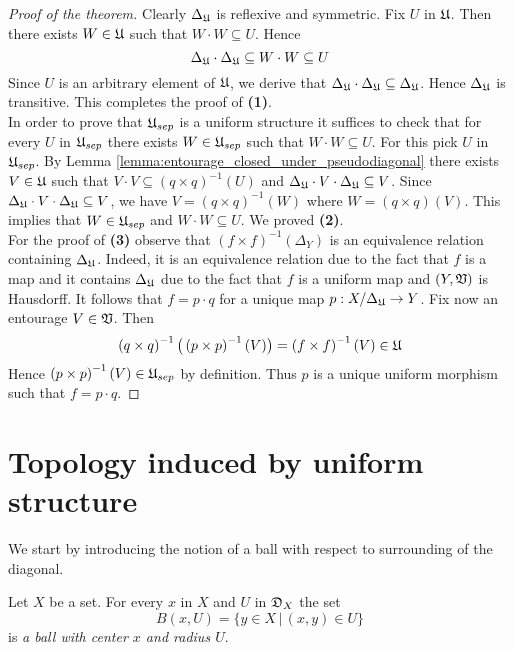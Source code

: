 \begin{proof}[Proof of the theorem]
Clearly $\Delta_{{\mathfrak U}}$ is reflexive and symmetric. Fix $U$ in ${\mathfrak U}$. Then there exists $W \in {\mathfrak U}$ such that $W\cdot W\subseteq U$. Hence 
$$\Delta_{{\mathfrak U}}\cdot \Delta_{{\mathfrak U}}\subseteq W\cdot W \subseteq U$$
Since $U$ is an arbitrary element of ${\mathfrak U}$, we derive that $\Delta_{{\mathfrak U}}\cdot \Delta_{{\mathfrak U}}\subseteq \Delta_{{\mathfrak U}}$. Hence $\Delta_{{\mathfrak U}}$ is transitive. This completes the proof of \textbf{(1)}.\\
In order to prove that ${\mathfrak U}_{sep}$ is a uniform structure it suffices to check that for every $U$ in ${\mathfrak U}_{sep}$ there exists $W \in {\mathfrak U}_{sep}$ such that $W\cdot W \subseteq U$. For this pick $U$ in ${\mathfrak U}_{sep}$. By Lemma \ref{lemma:entourage_closed_under_pseudodiagonal} there exists $V\in {\mathfrak U}$ such that $V\cdot V\subseteq \left(q\times q\right)^{-1}(U)$ and $\Delta_{{\mathfrak U}}\cdot V\cdot \Delta_{{\mathfrak U}}\subseteq V$. Since $\Delta_{{\mathfrak U}}\cdot V\cdot \Delta_{{\mathfrak U}}\subseteq V$, we have $V = \left(q\times q\right)^{-1}(W)$ where $W = \left(q\times q\right)\left(V\right)$. This implies that $W \in {\mathfrak U}_{sep}$ and $W\cdot W\subseteq U$. We proved \textbf{(2)}.\\
For the proof of \textbf{(3)} observe that $\left(f\times f\right)^{-1}\left(\Delta_Y\right)$ is an equivalence relation containing $\Delta_{{\mathfrak U}}$. Indeed, it is an equivalence relation due to the fact that $f$ is a map and it contains $\Delta_{{\mathfrak U}}$ due to the fact that $f$ is a uniform map and $(Y,{\mathfrak V})$ is Hausdorff. It follows that $f = p\cdot q$ for a unique map $p:X/\Delta_{{\mathfrak U}}\rightarrow Y$. Fix now an entourage $V \in {\mathfrak V}$. Then 
$$\left(q\times q\right)^{-1}\big(\left(p\times p\right)^{-1}(V)\big) = \left(f\times f\right)^{-1}(V) \in {\mathfrak U}$$
Hence $\left(p\times p\right)^{-1}(V) \in {\mathfrak U}_{sep}$ by definition. Thus $p$ is a unique uniform morphism such that $f = p\cdot q$.
\end{proof}

\section{Topology induced by uniform structure}
\noindent
We start by introducing the notion of a ball with respect to surrounding of the diagonal.

\begin{definition}
Let $X$ be a set. For every $x$ in $X$ and $U$ in ${\mathfrak D}_X$ the set
$$B(x,U) = \big\{y\in X\,\big|\,(x,y)\in U\big\}$$
is \textit{a ball with center $x$ and radius $U$}.
\end{definition}

